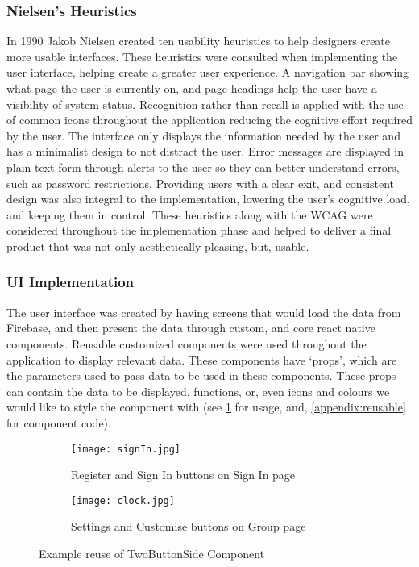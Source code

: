 \subsubsection{Nielsen's Heuristics }
In 1990 Jakob Nielsen created ten usability heuristics \cite{nielsen} to help designers create more usable interfaces. These heuristics were consulted when implementing the user interface, helping create a greater user experience. A navigation bar showing what page the user is currently on, and page headings help the user have a visibility of system status. Recognition rather than recall is applied with the use of common icons throughout the application reducing the cognitive effort required by the user. The interface only displays the information needed by the user and has a minimalist design to not distract the user. Error messages are displayed in plain text form through alerts to the user so they can better understand errors, such as password restrictions. Providing users with a clear exit, and consistent design was also integral to the implementation, lowering the user's cognitive load, and keeping them in control. These heuristics along with the WCAG were considered throughout the implementation phase and helped to deliver a final product that was not only aesthetically pleasing, but, usable.

\subsubsection{UI Implementation}
The user interface was created by having screens that would load the data from Firebase, and then present the data through custom, and core react native components. Reusable customized components were used throughout the application to display relevant data. These components have `props', which are the parameters used to pass data to be used in these components. These props can contain the data to be displayed, functions, or, even icons and colours we would like to style the component with (see \ref{fig:reuseComp} for usage, and, \ref{appendix:reusable} for component code).


\begin{figure}[!htbp]
    \centering
    \begin{subfigure}[b]{0.25\textwidth}
        \texttt{[image: signIn.jpg]}
        \caption{Register and Sign In buttons on Sign In page}
    \end{subfigure}
    \hspace{1.5em}
    \begin{subfigure}[b]{0.25\textwidth}
        \texttt{[image: clock.jpg]}
        \caption{Settings and Customise buttons on Group page}
    \end{subfigure}
    \caption{Example reuse of TwoButtonSide Component}
    \label{fig:reuseComp}
\end{figure}
\FloatBarrier
